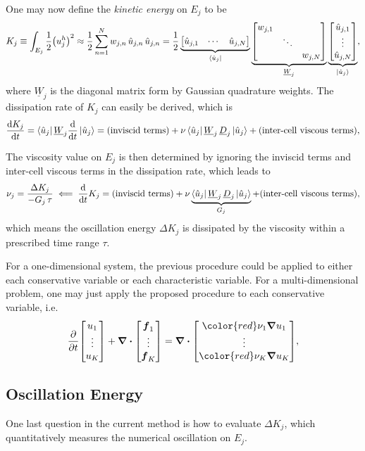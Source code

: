 \documentclass[10pt,draft]{article}
\begin{document}
%
One may now define the \emph{kinetic energy} on $E_j$ to be
$$
K_{j}\equiv\int_{E_{j}}\frac{1}{2}\qty(u_{j}^{h})^{2}\approx\frac{1}{2}\sum_{n=1}^{N}w_{j,n}\,\hat{u}_{j,n}\,\hat{u}_{j,n}=\frac{1}{2}\underbrace{\begin{bmatrix}\hat{u}_{j,1} & \cdots & \hat{u}_{j,N}\end{bmatrix}}_{\bra{\hat{u}_{j}}}\underbrace{\begin{bmatrix}w_{j,1}\\
 & \ddots\\
 &  & w_{j,N}
\end{bmatrix}}_{\underline{W}_{j}}\underbrace{\begin{bmatrix}\hat{u}_{j,1}\\
\vdots\\
\hat{u}_{j,N}
\end{bmatrix}}_{\ket{\hat{u}_{j}}},
$$
where $\underline{W}_{j}$ is the diagonal matrix form by Gaussian quadrature weights.
%
The dissipation rate of $K_j$ can easily be derived, which is
$$
\dv{K_j}{t}=\bra{\hat{u}_{j}}\underline{W}_{j}\dv{t}\ket{\hat{u}_{j}}=(\text{inviscid terms})+\nu\bra{\hat{u}_{j}}\underline{W}_{j}\,\underline{D}_{j}\ket{\hat{u}_{j}}+(\text{inter-cell viscous terms}),
$$

The viscosity value on $E_j$ is then determined by ignoring the inviscid terms and inter-cell viscous terms in the dissipation rate, which leads to
$$
\nu_{j}=\frac{\Delta K_{j}}{-G_{j}\,\tau}
\impliedby\dv{t}K_{j}=(\text{inviscid terms})+\nu\underbrace{\bra{\hat{u}_{j}}\underline{W}_{j}\,\underline{D}_{j}\ket{\hat{u}_{j}}}_{G_{j}}+(\text{inter-cell viscous terms}),
$$
which means the oscillation energy $\Delta K_{j}$ is dissipated by the viscosity within a prescribed time range $\tau$.

%
For a one-dimensional system, the previous procedure could be applied to either each conservative variable or each characteristic variable.
%
For a multi-dimensional problem, one may just apply the proposed procedure to each conservative variable, i.e.
$$
\pdv{t}\mqty[u_1\\ \vdots \\ u_K]+\grad\vdot\mqty[\vb*{f}_1\\ \vdots \\ \vb*{f}_K]
=\grad\vdot\mqty[{\color{red}\nu_1}\grad{u}_1\\ \vdots \\ {\color{red}\nu_K}\grad{u}_K],
$$

\subsection{Oscillation Energy}
One last question in the current method is how to evaluate $\Delta K_j$, which quantitatively measures the numerical oscillation on $E_j$.
%
\end{document}
